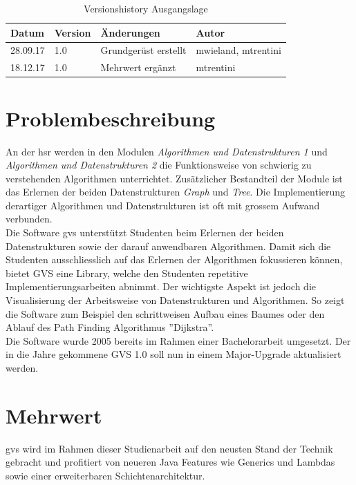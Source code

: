 \documentclass[11pt,a4paper,english,oneside]{book}
\numberwithin{equation}{chapter}
\begin{document}
	\begin{table}[h!]
		\centering
		\begin{tabularx}{\linewidth}{l l X l}
			\toprule 
			Datum & Version & Änderungen & Autor \\
			\midrule
			28.09.17 & 1.0 & Grundgerüst erstellt & mwieland, mtrentini \\
			18.12.17 & 1.0 & Mehrwert ergänzt & mtrentini \\
			\bottomrule 
		\end{tabularx} 
		\caption{Versionshistory Ausgangslage} 
	\end{table}
	
	
	\section{Problembeschreibung}
	An der \gls{hsr} werden in den Modulen \textit{Algorithmen und Datenstrukturen 1} und \textit{Algorithmen und Datenstrukturen 2} die Funktionsweise von schwierig zu verstehenden Algorithmen unterrichtet. Zusätzlicher Bestandteil der Module ist das Erlernen der beiden Datenstrukturen \textit{Graph} und \textit{Tree}. Die Implementierung derartiger Algorithmen und Datenstrukturen ist oft mit grossem Aufwand verbunden. \\
	Die Software \gls{gvs} unterstützt Studenten beim Erlernen der beiden Datenstrukturen sowie der darauf anwendbaren Algorithmen. Damit sich die Studenten ausschliesslich auf das Erlernen der Algorithmen fokussieren können, bietet GVS eine Library, welche den Studenten repetitive Implementierungsarbeiten abnimmt. Der wichtigste Aspekt ist jedoch die Visualisierung der Arbeitsweise von Datenstrukturen und Algorithmen. So zeigt die Software zum Beispiel den schrittweisen Aufbau eines Baumes oder den Ablauf des Path Finding Algorithmus ''Dijkstra''. \\
	Die Software wurde 2005 bereits im Rahmen einer Bachelorarbeit umgesetzt. Der in die Jahre gekommene GVS 1.0 soll nun in einem Major-Upgrade aktualisiert werden.
	
	
	
	\section{Mehrwert}
	\gls{gvs} wird im Rahmen dieser Studienarbeit auf den neusten Stand der Technik gebracht und profitiert von neueren Java Features wie Generics und Lambdas sowie einer erweiterbaren Schichtenarchitektur. \\
	
\end{document}
